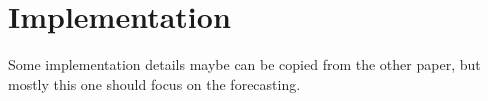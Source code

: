 \section{Implementation}
\label{sec:implementation}

Some implementation details maybe can be copied from the other paper, but mostly this one should focus on the forecasting.